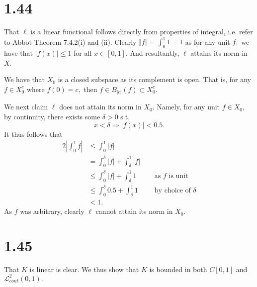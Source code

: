 \documentclass[10pt]{article}
\begin{document}
\section*{1.44}

That $\ell$ is a linear functional follows directly from properties of integral, i.e. refer to Abbot Theorem 7.4.2(i) and (ii). Clearly $\Vert f \Vert = \int_{0}^{1}1 = 1$ as for any unit $f,$ we have that $|f(x)|\le 1$ for all $x\in[0,1].$ And resultantly, $\ell$ attains its norm in $X$. 

We have that $X_0$ is a closed subspace as its complement is open. That is, for any $f \in X_0^c$ where $f(0)=c,$ then $f\in B_{|c|}(f)\subset X_0^c.$

We next claim $\ell$ does not attain its norm in $X_0.$ Namely, for any unit $f\in X_0,$ by continuity, there exists some $\delta > 0$ s.t.
\[x < \delta \Rightarrow |f(x)| < 0.5.\]
It thus follows that
\begin{alignat*}{2}
    \left |\int_{0}^{1}f \right | &\le \int_{0}^{1} |f|\\
    &= \int_{0}^{\delta}|f| + \int_{\delta}^{1}|f|\\
    &\le \int_{0}^{\delta}|f| + \int_{\delta}^{1}1 \quad&&\text{as $f$ is unit}\\
    &\le \int_{0}^{\delta}0.5 + \int_{\delta}^{1}1 &&\text{by choice of $\delta$}\\
    &< 1.
\end{alignat*}
As $f$ was arbitrary, clearly $\ell$ cannot attain its norm in $X_0$.


\section*{1.45}

That $K$ is linear is clear. We thus show that $K$ is bounded in both $C[0,1]$ and $\mathcal{L}^2_{cont}(0,1).$\\
\end{document}
